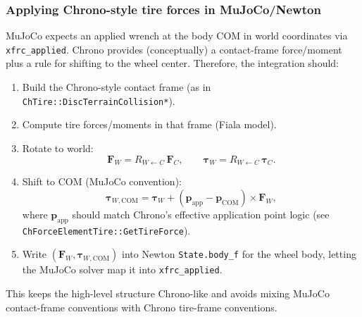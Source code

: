 \subsubsection{Applying Chrono-style tire forces in MuJoCo/Newton}
MuJoCo expects an applied wrench at the body COM in world coordinates via \texttt{xfrc\_applied}.
Chrono provides (conceptually) a contact-frame force/moment plus a rule for shifting to the wheel center.
Therefore, the integration should:
\begin{enumerate}
  \item Build the Chrono-style contact frame (as in \texttt{ChTire::DiscTerrainCollision*}).
  \item Compute tire forces/moments in that frame (Fiala model).
  \item Rotate to world:
    \[
      \mathbf{F}_W = R_{W\leftarrow C}\,\mathbf{F}_C,\qquad
      \boldsymbol{\tau}_W = R_{W\leftarrow C}\,\boldsymbol{\tau}_C.
    \]
  \item Shift to COM (MuJoCo convention):
    \[
      \boldsymbol{\tau}_{W,\mathrm{COM}} = \boldsymbol{\tau}_W + (\mathbf{p}_{\mathrm{app}} - \mathbf{p}_{\mathrm{COM}}) \times \mathbf{F}_W,
    \]
    where $\mathbf{p}_{\mathrm{app}}$ should match Chrono's effective application point logic
    (see \texttt{ChForceElementTire::GetTireForce}).
  \item Write $(\mathbf{F}_W,\boldsymbol{\tau}_{W,\mathrm{COM}})$ into Newton \texttt{State.body\_f} for the wheel body,
        letting the MuJoCo solver map it into \texttt{xfrc\_applied}.
\end{enumerate}
\noindent
This keeps the high-level structure Chrono-like and avoids mixing MuJoCo contact-frame conventions with Chrono tire-frame conventions.

